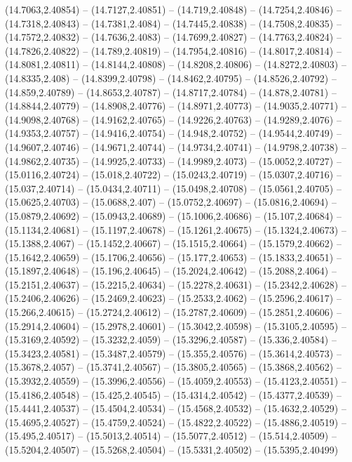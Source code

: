 {(14.7063,2.40854) -- (14.7127,2.40851) -- (14.719,2.40848) -- (14.7254,2.40846) -- (14.7318,2.40843) -- (14.7381,2.4084) -- (14.7445,2.40838) -- (14.7508,2.40835) -- (14.7572,2.40832) -- (14.7636,2.4083) -- (14.7699,2.40827) -- (14.7763,2.40824) --
(14.7826,2.40822) -- (14.789,2.40819) -- (14.7954,2.40816) -- (14.8017,2.40814) -- (14.8081,2.40811) -- (14.8144,2.40808) -- (14.8208,2.40806) -- (14.8272,2.40803) -- (14.8335,2.408) -- (14.8399,2.40798) -- (14.8462,2.40795) -- (14.8526,2.40792) --
(14.859,2.40789) -- (14.8653,2.40787) -- (14.8717,2.40784) -- (14.878,2.40781) -- (14.8844,2.40779) -- (14.8908,2.40776) -- (14.8971,2.40773) -- (14.9035,2.40771) -- (14.9098,2.40768) -- (14.9162,2.40765) -- (14.9226,2.40763) -- (14.9289,2.4076) --
(14.9353,2.40757) -- (14.9416,2.40754) -- (14.948,2.40752) -- (14.9544,2.40749) -- (14.9607,2.40746) -- (14.9671,2.40744) -- (14.9734,2.40741) -- (14.9798,2.40738) -- (14.9862,2.40735) -- (14.9925,2.40733) -- (14.9989,2.4073) -- (15.0052,2.40727) --
(15.0116,2.40724) -- (15.018,2.40722) -- (15.0243,2.40719) -- (15.0307,2.40716) -- (15.037,2.40714) -- (15.0434,2.40711) -- (15.0498,2.40708) -- (15.0561,2.40705) -- (15.0625,2.40703) -- (15.0688,2.407) -- (15.0752,2.40697) -- (15.0816,2.40694) --
(15.0879,2.40692) -- (15.0943,2.40689) -- (15.1006,2.40686) -- (15.107,2.40684) -- (15.1134,2.40681) -- (15.1197,2.40678) -- (15.1261,2.40675) -- (15.1324,2.40673) -- (15.1388,2.4067) -- (15.1452,2.40667) -- (15.1515,2.40664) -- (15.1579,2.40662) --
(15.1642,2.40659) -- (15.1706,2.40656) -- (15.177,2.40653) -- (15.1833,2.40651) -- (15.1897,2.40648) -- (15.196,2.40645) -- (15.2024,2.40642) -- (15.2088,2.4064) -- (15.2151,2.40637) -- (15.2215,2.40634) -- (15.2278,2.40631) -- (15.2342,2.40628) --
(15.2406,2.40626) -- (15.2469,2.40623) -- (15.2533,2.4062) -- (15.2596,2.40617) -- (15.266,2.40615) -- (15.2724,2.40612) -- (15.2787,2.40609) -- (15.2851,2.40606) -- (15.2914,2.40604) -- (15.2978,2.40601) -- (15.3042,2.40598) -- (15.3105,2.40595) --
(15.3169,2.40592) -- (15.3232,2.4059) -- (15.3296,2.40587) -- (15.336,2.40584) -- (15.3423,2.40581) -- (15.3487,2.40579) -- (15.355,2.40576) -- (15.3614,2.40573) -- (15.3678,2.4057) -- (15.3741,2.40567) -- (15.3805,2.40565) -- (15.3868,2.40562) --
(15.3932,2.40559) -- (15.3996,2.40556) -- (15.4059,2.40553) -- (15.4123,2.40551) -- (15.4186,2.40548) -- (15.425,2.40545) -- (15.4314,2.40542) -- (15.4377,2.40539) -- (15.4441,2.40537) -- (15.4504,2.40534) -- (15.4568,2.40532) -- (15.4632,2.40529)
-- (15.4695,2.40527) -- (15.4759,2.40524) -- (15.4822,2.40522) -- (15.4886,2.40519) -- (15.495,2.40517) -- (15.5013,2.40514) -- (15.5077,2.40512) -- (15.514,2.40509) -- (15.5204,2.40507) -- (15.5268,2.40504) -- (15.5331,2.40502) -- (15.5395,2.40499)
}
